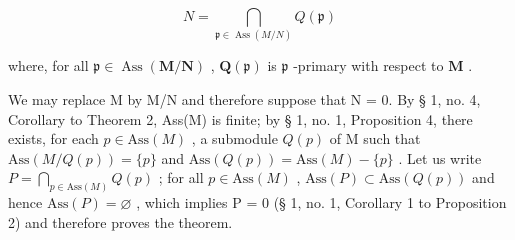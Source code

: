 \[
N = \bigcap_ {\mathfrak {p} \in \operatorname{Ass} (M / N)} Q (\mathfrak {p})\tag{1}
\]

where, for all \(\mathfrak{p} \in \operatorname{Ass}(\mathbf{M} / \mathbf{N})\) , \(\mathbf{Q}(\mathfrak{p})\) is \(\mathfrak{p}\) -primary with respect to \(\mathbf{M}\) .

We may replace M by M/N and therefore suppose that N = 0. By § 1, no. 4, Corollary to Theorem 2, Ass(M) is finite; by § 1, no. 1, Proposition 4, there exists, for each \(p \in \text{Ass}(M)\) , a submodule \(Q(p)\) of M such that \(\text{Ass}(M/Q(p)) = \{p\}\) and \(\text{Ass}(Q(p)) = \text{Ass}(M) - \{p\}\) . Let us write \(P = \bigcap_{p \in \text{Ass}(M)} Q(p)\) ; for all \(p \in \text{Ass}(M)\) , \(\text{Ass}(P) \subset \text{Ass}(Q(p))\) and hence \(\text{Ass}(P) = \varnothing\) , which implies P = 0 (§ 1, no. 1, Corollary 1 to Proposition 2) and therefore proves the theorem.

